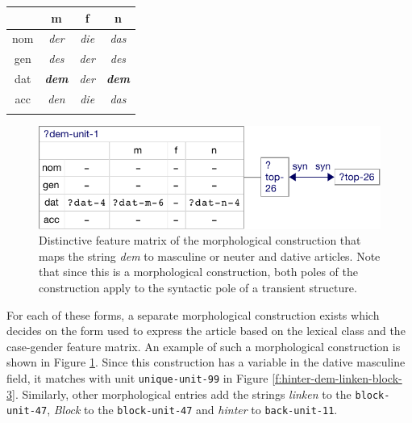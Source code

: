 \begin{center}
  \begin{tabular}{cccc}
  	\lsptoprule
    & m & f & n \\ \midrule
    nom  & \emph{der} & \emph{die} & \emph{das} \\
    gen  & \emph{des} & \emph{der} & \emph{des} \\
    dat & \bf{\emph{dem}} & \emph{der} & \bf{\emph{dem}} \\
    acc & \emph{den} & \emph{die} & \emph{das} \\ 
	\lspbottomrule
  \end{tabular}
\end{center}

\begin{figure}[t]
  \centerline{\includegraphics[scale=0.65]{figs/dem-morph-fvm}}
  \caption[Distinctive feature matrix of a morphological construction]{%
  Distinctive feature matrix of the morphological construction
    that maps the string \textit{dem} to masculine or neuter and dative
    articles. Note that since this is a morphological construction, both
    poles of the construction apply to the syntactic pole of a transient
    structure.}
  \label{f:dem-morph}
\end{figure}

For each of these forms, a separate morphological construction exists
which decides on the form used to express the article
based on the lexical class and the case-gender feature matrix. An example of such a
morphological construction is shown in Figure \ref{f:dem-morph}. Since
this construction has a variable in the dative masculine field, it
matches with unit {\footnotesize\texttt{unique-unit-99}} in Figure
\ref{f:hinter-dem-linken-block-3}. Similarly, other morphological
entries add the strings \textit{linken} to the {\footnotesize\texttt{block-unit-47}},
\textit{Block} to the {\footnotesize\texttt{block-unit-47}} and \textit{hinter} to
{\footnotesize\texttt{back-unit-11}}.

